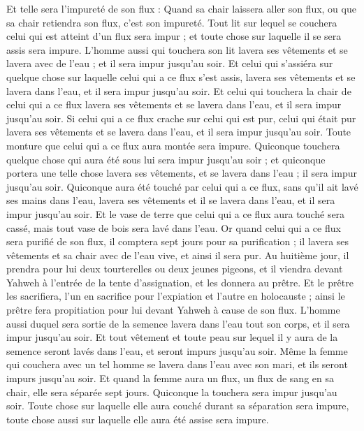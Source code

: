 \begin{multicols}{2}
Et telle sera l'impureté de son flux : Quand sa chair laissera aller son flux, ou que sa chair retiendra son flux, c'est son impureté.
Tout lit sur lequel se couchera celui qui est atteint d'un flux sera impur ; et toute chose sur laquelle il se sera assis sera impure.
L'homme aussi qui touchera son lit lavera ses vêtements et se lavera avec de l'eau ; et il sera impur jusqu'au soir.
Et celui qui s'assiéra sur quelque chose sur laquelle celui qui a ce flux s'est assis, lavera ses vêtements et se lavera dans l'eau, et il sera impur jusqu'au soir.
Et celui qui touchera la chair de celui qui a ce flux lavera ses vêtements et se lavera dans l'eau, et il sera impur jusqu'au soir.
Si celui qui a ce flux crache sur celui qui est pur, celui qui était pur lavera ses vêtements et se lavera dans l'eau, et il sera impur jusqu'au soir.
Toute monture que celui qui a ce flux aura montée sera impure.
Quiconque touchera quelque chose qui aura été sous lui sera impur jusqu'au soir ; et quiconque portera une telle chose lavera ses vêtements, et se lavera dans l'eau ; il sera impur jusqu'au soir.
Quiconque aura été touché par celui qui a ce flux, sans qu'il ait lavé ses mains dans l'eau, lavera ses vêtements et il se lavera dans l'eau, et il sera impur jusqu'au soir.
Et le vase de terre que celui qui a ce flux aura touché sera cassé, mais tout vase de bois sera lavé dans l'eau.
Or quand celui qui a ce flux sera purifié de son flux, il comptera sept jours pour sa purification ; il lavera ses vêtements et sa chair avec de l'eau vive, et ainsi il sera pur.
Au huitième jour, il prendra pour lui deux tourterelles ou deux jeunes pigeons, et il viendra devant Yahweh à l'entrée de la tente d'assignation, et les donnera au prêtre.
Et le prêtre les sacrifiera, l'un en sacrifice pour l'expiation et l'autre en holocauste ; ainsi le prêtre fera propitiation pour lui devant Yahweh à cause de son flux.
L'homme aussi duquel sera sortie de la semence lavera dans l'eau tout son corps, et il sera impur jusqu'au soir.
Et tout vêtement et toute peau sur lequel il y aura de la semence seront lavés dans l'eau, et seront impurs jusqu'au soir.
Même la femme qui couchera avec un tel homme se lavera dans l'eau avec son mari, et ils seront impurs jusqu'au soir.
Et quand la femme aura un flux, un flux de sang en sa chair, elle sera séparée sept jours. Quiconque la touchera sera impur jusqu'au soir.
Toute chose sur laquelle elle aura couché durant sa séparation sera impure, toute chose aussi sur laquelle elle aura été assise sera impure.

\end{multicols}
